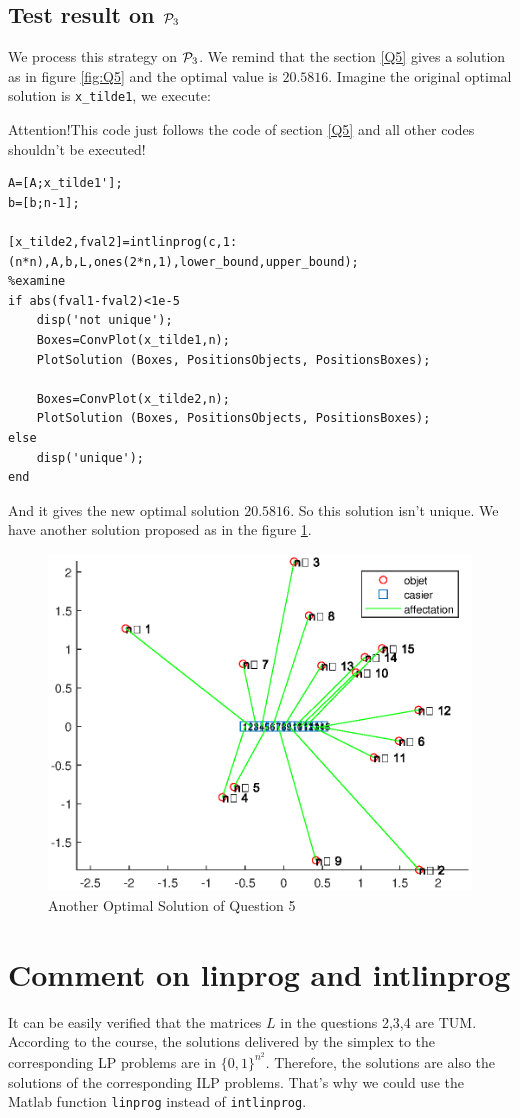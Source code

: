 \documentclass{CSArticle}[english]
\begin{document}
\subsection{Test result on $\mathcal{P}_3$}
We process this strategy on $\mathcal{P}_3$. We remind that the section \ref{Q5} gives a solution as in figure \ref{fig:Q5} and the optimal value is $20.5816$. Imagine the original optimal solution is \verb|x_tilde1|, we execute:
\par {\color{red}Attention!This code just follows the code of section \ref{Q5} and all other codes shouldn't be executed!}
\begin{lstlisting}[style=MATLAB]
%New solution
A=[A;x_tilde1'];
b=[b;n-1];

[x_tilde2,fval2]=intlinprog(c,1:(n*n),A,b,L,ones(2*n,1),lower_bound,upper_bound);
%examine
if abs(fval1-fval2)<1e-5
    disp('not unique');
    Boxes=ConvPlot(x_tilde1,n);
    PlotSolution (Boxes, PositionsObjects, PositionsBoxes);

    Boxes=ConvPlot(x_tilde2,n);
    PlotSolution (Boxes, PositionsObjects, PositionsBoxes);
else
    disp('unique');
end

\end{lstlisting}
And it gives the new optimal solution $20.5816$. So this solution isn't unique. We have another solution proposed as in the figure \ref{fig:Q7}.
\begin{figure}[ht]
\centering
\includegraphics[scale=0.6]{figure/Q7.eps}
\caption{Another Optimal Solution of Question 5}
\label{fig:Q7}
\end{figure}

\section{Comment on linprog and intlinprog}
It can be easily verified that the matrices $L$ in the questions 2,3,4 are TUM. According to the course, the solutions delivered by the simplex to the corresponding LP problems are in $\{0,1\}^{n^2}$. Therefore, the solutions are also the solutions of the corresponding ILP problems. That's why we could use the Matlab function \verb|linprog| instead of \verb|intlinprog|.
\end{document}
